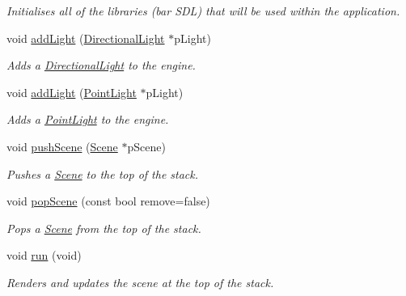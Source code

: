 \begin{DoxyCompactItemize}
\begin{DoxyCompactList}\small\item\em Initialises all of the libraries (bar S\+DL) that will be used within the application. \end{DoxyCompactList}\item 
void \hyperlink{classsparky_1_1_game_manager_a4e16d2485230f32b2368f2ee1b2eeeee}{add\+Light} (\hyperlink{classsparky_1_1_directional_light}{Directional\+Light} $\ast$p\+Light)
\begin{DoxyCompactList}\small\item\em Adds a \hyperlink{classsparky_1_1_directional_light}{Directional\+Light} to the engine. \end{DoxyCompactList}\item 
void \hyperlink{classsparky_1_1_game_manager_abd504046cc68169b39bc317d045e269d}{add\+Light} (\hyperlink{classsparky_1_1_point_light}{Point\+Light} $\ast$p\+Light)
\begin{DoxyCompactList}\small\item\em Adds a \hyperlink{classsparky_1_1_point_light}{Point\+Light} to the engine. \end{DoxyCompactList}\item 
void \hyperlink{classsparky_1_1_game_manager_a3126c3833bdcfc94bc46892c1dbb2edc}{push\+Scene} (\hyperlink{classsparky_1_1_scene}{Scene} $\ast$p\+Scene)
\begin{DoxyCompactList}\small\item\em Pushes a \hyperlink{classsparky_1_1_scene}{Scene} to the top of the stack. \end{DoxyCompactList}\item 
void \hyperlink{classsparky_1_1_game_manager_ac9f267379f0474c46ade05e100b2339d}{pop\+Scene} (const bool remove=false)
\begin{DoxyCompactList}\small\item\em Pops a \hyperlink{classsparky_1_1_scene}{Scene} from the top of the stack. \end{DoxyCompactList}\item 
void \hyperlink{classsparky_1_1_game_manager_ae206d220ec615b513f952ad2d438d2e6}{run} (void)\hypertarget{classsparky_1_1_game_manager_ae206d220ec615b513f952ad2d438d2e6}{}\label{classsparky_1_1_game_manager_ae206d220ec615b513f952ad2d438d2e6}

\begin{DoxyCompactList}\small\item\em Renders and updates the scene at the top of the stack. \end{DoxyCompactList}\end{DoxyCompactItemize}

